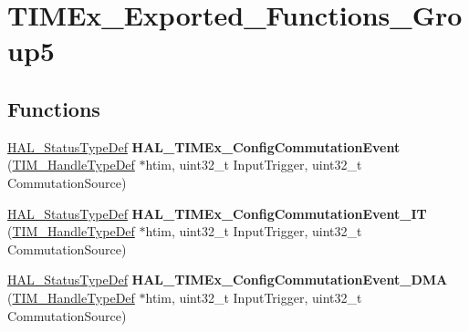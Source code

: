 \hypertarget{group___t_i_m_ex___exported___functions___group5}{}\section{T\+I\+M\+Ex\+\_\+\+Exported\+\_\+\+Functions\+\_\+\+Group5}
\label{group___t_i_m_ex___exported___functions___group5}
\subsection*{Functions}
\begin{DoxyCompactItemize}
\item 
\mbox{\label{group___t_i_m_ex___exported___functions___group5_ga0870c20c0412896f6321f71ede9e5a3d}} 
\mbox{\hyperlink{stm32f4xx__hal__def_8h_a63c0679d1cb8b8c684fbb0632743478f}{H\+A\+L\+\_\+\+Status\+Type\+Def}} {\bfseries H\+A\+L\+\_\+\+T\+I\+M\+Ex\+\_\+\+Config\+Commutation\+Event} (\mbox{\hyperlink{struct_t_i_m___handle_type_def}{T\+I\+M\+\_\+\+Handle\+Type\+Def}} $\ast$htim, uint32\+\_\+t Input\+Trigger, uint32\+\_\+t Commutation\+Source)
\item 
\mbox{\label{group___t_i_m_ex___exported___functions___group5_ga2a50ed8d310449f6535c6627da26ed35}} 
\mbox{\hyperlink{stm32f4xx__hal__def_8h_a63c0679d1cb8b8c684fbb0632743478f}{H\+A\+L\+\_\+\+Status\+Type\+Def}} {\bfseries H\+A\+L\+\_\+\+T\+I\+M\+Ex\+\_\+\+Config\+Commutation\+Event\+\_\+\+IT} (\mbox{\hyperlink{struct_t_i_m___handle_type_def}{T\+I\+M\+\_\+\+Handle\+Type\+Def}} $\ast$htim, uint32\+\_\+t Input\+Trigger, uint32\+\_\+t Commutation\+Source)
\item 
\mbox{\label{group___t_i_m_ex___exported___functions___group5_gac821ce78d607cca00a5f06496beed76e}} 
\mbox{\hyperlink{stm32f4xx__hal__def_8h_a63c0679d1cb8b8c684fbb0632743478f}{H\+A\+L\+\_\+\+Status\+Type\+Def}} {\bfseries H\+A\+L\+\_\+\+T\+I\+M\+Ex\+\_\+\+Config\+Commutation\+Event\+\_\+\+D\+MA} (\mbox{\hyperlink{struct_t_i_m___handle_type_def}{T\+I\+M\+\_\+\+Handle\+Type\+Def}} $\ast$htim, uint32\+\_\+t Input\+Trigger, uint32\+\_\+t Commutation\+Source)
\item 
\mbox{\label{group___t_i_m_ex___exported___functions___group5_ga056fd97d3be6c60dcfa12963f6ec8aad}} 

\end{DoxyCompactItemize}
